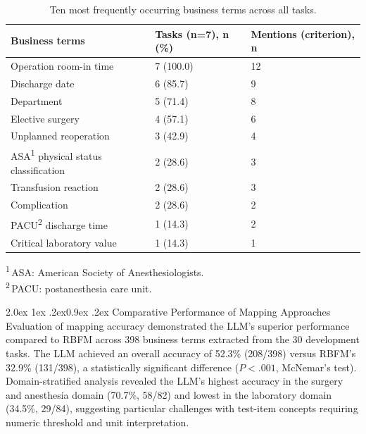 \documentclass[10pt]{article}
\makeatletter
\renewcommand\subsection{\@startsection{subsection}{2}{\z@}%
  {2.0ex \@plus 1ex \@minus .2ex}{0.9ex \@plus .2ex}%
  {\normalfont\normalsize\bfseries}}
\newcommand{\tnote}[1]{\textsuperscript{#1}}
\newcommand{\tabfoot}[1]{\par\vspace{2pt}\begingroup\raggedright\footnotesize
  \noindent #1\par\endgroup}
\newcommand{\tnotedef}[1]{\textsuperscript{#1}\,}
\makeatother
\begin{document}
\begin{table}[!ht]
\caption{Ten most frequently occurring business terms across all tasks.}
\label{tab:terms}
\centering
\footnotesize
\begin{tabular*}{\linewidth}{@{\extracolsep{\fill}}lll@{}}
\toprule
Business terms & Tasks (n=7), n (\%) & Mentions (criterion), n\\
\midrule
Operation room-in time                 & 7 (100.0) & 12\\
Discharge date                         & 6 (85.7)  & 9\\
Department                             & 5 (71.4)  & 8\\
Elective surgery                       & 4 (57.1)  & 6\\
Unplanned reoperation                  & 3 (42.9)  & 4\\
ASA\tnote{1} physical status classification & 2 (28.6) & 3\\
Transfusion reaction                   & 2 (28.6)  & 3\\
Complication                           & 2 (28.6)  & 2\\
PACU\tnote{2} discharge time           & 1 (14.3)  & 2\\
Critical laboratory value              & 1 (14.3)  & 1\\
\bottomrule
\end{tabular*}
\tabfoot{\tnotedef{1}ASA: American Society of Anesthesiologists.\\
\tnotedef{2}PACU: postanesthesia care unit.}
\end{table}

\subsection{Comparative Performance of Mapping Approaches}
Evaluation of mapping accuracy demonstrated the LLM's superior performance
compared to RBFM across 398 business terms extracted from the 30 development
tasks. The LLM achieved an overall accuracy of 52.3\% (208/398) versus RBFM's 32.9\% (131/398), a statistically significant difference ($P<.001$, McNemar's
test). Domain-stratified analysis revealed the LLM's highest accuracy in the
surgery and anesthesia domain (70.7\%, 58/82) and lowest in the laboratory domain (34.5\%, 29/84), suggesting particular challenges with test-item concepts
requiring numeric threshold and unit interpretation.
\end{document}
